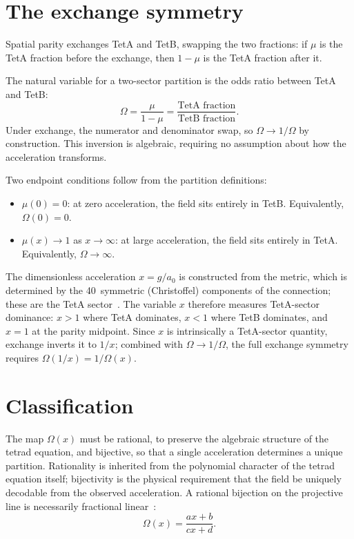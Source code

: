 \documentclass[twocolumn]{iopjournal}
\begin{document}

\section*{The exchange symmetry}

Spatial parity exchanges TetA and TetB, swapping the two
fractions: if $\mu$ is the TetA fraction before the exchange,
then $1 - \mu$ is the TetA fraction after it.

The natural variable for a two-sector partition is the odds
ratio between TetA and TetB:
\begin{equation}
  \Omega = \frac{\mu}{1 - \mu}
  = \frac{\text{TetA fraction}}{\text{TetB fraction}}.
  \label{eq:odds}
\end{equation}
Under exchange, the numerator and denominator swap, so
$\Omega \to 1/\Omega$ by construction. This inversion is
algebraic, requiring no assumption about how the acceleration
transforms.

Two endpoint conditions follow from the partition definitions:
\begin{itemize}
\item $\mu(0) = 0$: at zero acceleration, the field sits
  entirely in TetB. Equivalently, $\Omega(0) = 0$.
\item $\mu(x) \to 1$ as $x \to \infty$: at large
  acceleration, the field sits entirely in TetA. Equivalently,
  $\Omega \to \infty$.
\end{itemize}

The dimensionless acceleration $x = g/a_0$ is constructed from
the metric, which is determined by the 40~symmetric
(Christoffel) components of the connection; these are the TetA
sector~\cite{Nelson2026a}. The variable $x$ therefore measures
TetA-sector dominance: $x > 1$ where TetA dominates, $x < 1$
where TetB dominates, and $x = 1$ at the parity midpoint.
Since $x$ is intrinsically a TetA-sector quantity, exchange
inverts it to $1/x$; combined with $\Omega \to 1/\Omega$, the
full exchange symmetry requires $\Omega(1/x) = 1/\Omega(x)$.


\section*{Classification}

The map $\Omega(x)$ must be rational, to preserve the
algebraic structure of the tetrad equation, and bijective,
so that a single acceleration determines a unique partition.
Rationality is inherited from the polynomial character of the
tetrad equation itself; bijectivity is the physical requirement
that the field be uniquely decodable from the observed
acceleration.
A rational bijection on the projective line is necessarily
fractional linear~\cite{Hartshorne1977}:
\begin{equation}
  \Omega(x) = \frac{ax + b}{cx + d}.
  \label{eq:mobius}
\end{equation}
\end{document}
